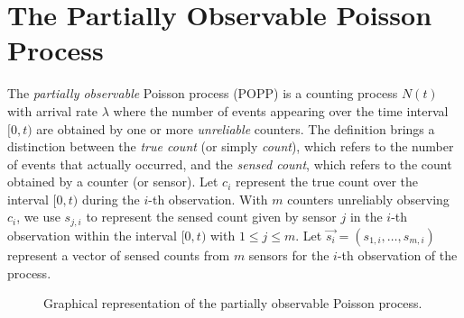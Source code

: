 
\section{The Partially Observable Poisson Process}
\label{sec:popp}

The \emph{partially observable} Poisson process (POPP) is a counting process $N(t)$ with arrival rate $\lambda$ where the number of events appearing over the time interval $[0, t)$ are obtained by one or more \emph{unreliable} counters. 
% 
The definition brings a distinction between the \emph{true count} (or simply \emph{count}), which refers to the number of events that actually occurred, and the \emph{sensed count}, which refers to the count obtained by a counter (or sensor). Let $c_i$ represent the true count over the interval $[0, t)$ during the $i$-th observation. With $m$ counters unreliably observing $c_i$, we use  $s_{j,i}$ to represent the sensed count given by sensor $j$ in the $i$-th observation within the interval $[0, t)$ with $1 \leq j \leq m$. Let $\vec{s_i} = (s_{1,i}, \ldots, s_{m,i})$ represent a vector of sensed counts from $m$ sensors for the $i$-th observation of the process. 
% 

\begin{figure}[t!]
	\centering
	\caption{Graphical representation of the partially observable Poisson process.}
	\label{fig:gm_popp}
\end{figure}



